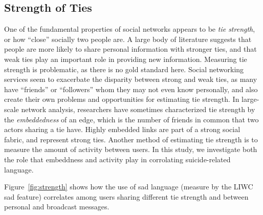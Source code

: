 \documentclass[11pt]{article}
\begin{document}
\subsection{Strength of Ties}
One of the fundamental properties of social networks appears to be \emph{tie strength}, or how ``close'' socially two people are. A large body of literature suggests that people are more likely to share personal information with stronger ties, and that weak ties play an important role in providing new information.  
Measuring tie strength is problematic, as there is no gold standard here. Social networking services seem to exacerbate the disparity between strong and weak ties, as many have ``friends'' or ``followers'' whom they may not even know personally, and also create their own problems and opportunities for estimating tie strength. In large-scale network analysis, researchers have sometimes characterized tie strength by the 
\emph{embeddedness} of an edge, which is the number of friends in common that two actors sharing a tie have. Highly embedded links are part of a strong social fabric, and represent strong ties. Another method of estimating tie strength is to measure the amount of activity between users. In this study, we investigate both the role that embeddness and activity play in corrolating suicide-related language. 

Figure~\ref{fig:strength} shows how the use of sad language (measure by the LIWC sad feature) correlates among users sharing different tie strength and between personal and broadcast messages.
\end{document}
